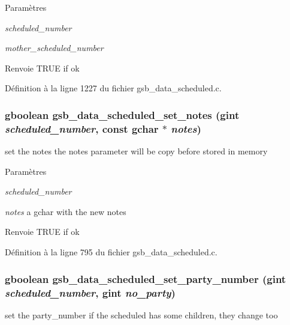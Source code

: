 \begin{DoxyParams}{Paramètres}
\item[{\em scheduled\_\-number}]\item[{\em mother\_\-scheduled\_\-number}]\end{DoxyParams}
\begin{DoxyReturn}{Renvoie}
TRUE if ok 
\end{DoxyReturn}


Définition à la ligne 1227 du fichier gsb\_\-data\_\-scheduled.c.

\subsubsection[{gsb\_\-data\_\-scheduled\_\-set\_\-notes}]{\setlength{\rightskip}{0pt plus 5cm}gboolean gsb\_\-data\_\-scheduled\_\-set\_\-notes (gint {\em scheduled\_\-number}, \/  const gchar $\ast$ {\em notes})}\label{gsb__data__scheduled_8h_aeb1f51ee0889bf8736e7ab914e0aeec1}
set the notes the notes parameter will be copy before stored in memory


\begin{DoxyParams}{Paramètres}
\item[{\em scheduled\_\-number}]\item[{\em notes}]a gchar with the new notes\end{DoxyParams}
\begin{DoxyReturn}{Renvoie}
TRUE if ok 
\end{DoxyReturn}


Définition à la ligne 795 du fichier gsb\_\-data\_\-scheduled.c.

\subsubsection[{gsb\_\-data\_\-scheduled\_\-set\_\-party\_\-number}]{\setlength{\rightskip}{0pt plus 5cm}gboolean gsb\_\-data\_\-scheduled\_\-set\_\-party\_\-number (gint {\em scheduled\_\-number}, \/  gint {\em no\_\-party})}\label{gsb__data__scheduled_8h_a91c6d9659e496ece4de95ce4fbc24f25}
set the party\_\-number if the scheduled has some children, they change too



